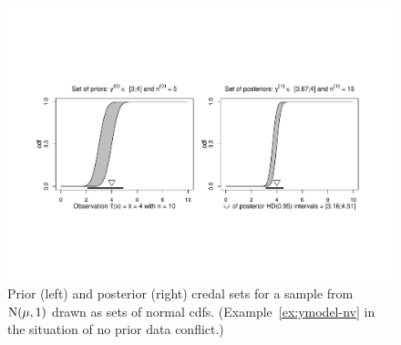 \begin{figure}
\includegraphics[trim = 20mm 50mm 20mm 50mm, clip, width=\textwidth]{fig/jstp-paper_nv_nfest_01-080331}%
\caption[\ymodel\ for samples from $\norm(\mu,1)$:
prior and posterior credal sets for data in accordance with prior beliefs.]%
{Prior (left) and posterior (right) credal sets for a sample
from $\norm(\mu,1)$ drawn as sets of normal cdfs. (Example~\ref{ex:ymodel-nv} in the
situation of no prior data conflict.)}
\label{fig:nv-nfest-nopdc}
\end{figure}


